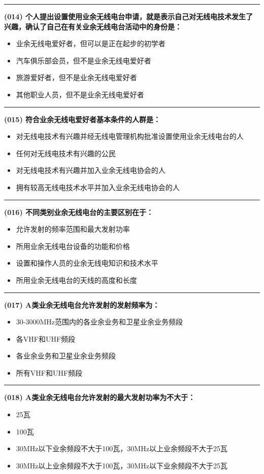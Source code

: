 \documentclass[twocolumn]{ctexart}  %
\begin{document}
\noindent\rule{0.5\textwidth}{1pt}
\heiti \textbf{(014) 个人提出设置使用业余无线电台申请，就是表示自己对无线电技术发生了兴趣，确认了自己在有关业余无线电台活动中的身份是：} \songti {\color{gray} [LK0052] }
\begin{itemize}
	\item  业余无线电爱好者，但可以是正在起步的初学者
	\item  汽车俱乐部会员，但不是业余无线电爱好者
	\item  旅游爱好者，但不是业余无线电爱好者
	\item  其他职业人员，但不是业余无线电爱好者
\end{itemize}


\noindent\rule{0.5\textwidth}{1pt}
\heiti \textbf{(015) 符合业余无线电爱好者基本条件的人群是：} \songti {\color{gray} [LK0112] }
\begin{itemize}
	\item  对无线电技术有兴趣并经无线电管理机构批准设置使用业余无线电台的人
	\item  任何对无线电技术有兴趣的公民
	\item  对无线电技术有兴趣并加入业余无线电协会的人
	\item  拥有较高无线电技术水平并加入业余无线电协会的人
\end{itemize}


\noindent\rule{0.5\textwidth}{1pt}
\heiti \textbf{(016) 不同类别业余无线电台的主要区别在于：} \songti {\color{gray} [LK0013] }
\begin{itemize}
	\item  允许发射的频率范围和最大发射功率
	\item  所用业余无线电台设备的功能和价格
	\item  设置和操作人员的业余无线电知识和技术水平
	\item  所用业余无线电台的天线的高度和长度
\end{itemize}


\noindent\rule{0.5\textwidth}{1pt}
\heiti \textbf{(017) A类业余无线电台允许发射的发射频率为：} \songti {\color{gray} [LK0014] }
\begin{itemize}
	\item  30-3000MHz范围内的各业余业务和卫星业余业务频段
	\item  各VHF和UHF频段
	\item  各业余业务和卫星业余业务频段
	\item  所有VHF和UHF频段
\end{itemize}


\noindent\rule{0.5\textwidth}{1pt}
\heiti \textbf{(018) A类业余无线电台允许发射的最大发射功率为不大于：} \songti {\color{gray} [LK0017] }
\begin{itemize}
	\item  25瓦
	\item  100瓦
	\item  30MHz以下业余频段不大于100瓦，30MHz以上业余频段不大于25瓦
	\item  30MHz以上业余频段不大于100瓦，30MHz以下业余频段不大于25瓦
\end{itemize}
\end{document}
